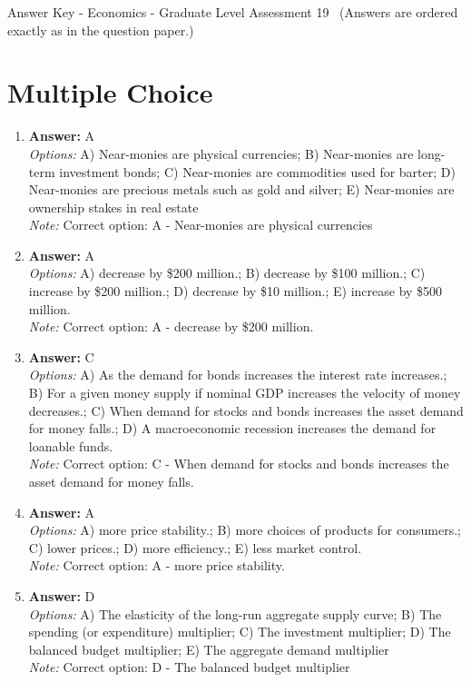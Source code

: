 \documentclass[12pt]{article}
\begin{document}
\begin{center}
Answer Key - Economics - Graduate Level Assessment 19 \
\small (Answers are ordered exactly as in the question paper.)
\end{center}

\section*{Multiple Choice}
\begin{enumerate}[label=\arabic*.]
\item \textbf{Answer:} A
\\ \textit{Options:} A) Near-monies are physical currencies; B) Near-monies are long-term investment bonds; C) Near-monies are commodities used for barter; D) Near-monies are precious metals such as gold and silver; E) Near-monies are ownership stakes in real estate
\\ \textit{Note:} Correct option: A - Near-monies are physical currencies
\item \textbf{Answer:} A
\\ \textit{Options:} A) decrease by \$200 million.; B) decrease by \$100 million.; C) increase by \$200 million.; D) decrease by \$10 million.; E) increase by \$500 million.
\\ \textit{Note:} Correct option: A - decrease by \$200 million.
\item \textbf{Answer:} C
\\ \textit{Options:} A) As the demand for bonds increases the interest rate increases.; B) For a given money supply if nominal GDP increases the velocity of money decreases.; C) When demand for stocks and bonds increases the asset demand for money falls.; D) A macroeconomic recession increases the demand for loanable funds.
\\ \textit{Note:} Correct option: C - When demand for stocks and bonds increases the asset demand for money falls.
\item \textbf{Answer:} A
\\ \textit{Options:} A) more price stability.; B) more choices of products for consumers.; C) lower prices.; D) more efficiency.; E) less market control.
\\ \textit{Note:} Correct option: A - more price stability.
\item \textbf{Answer:} D
\\ \textit{Options:} A) The elasticity of the long-run aggregate supply curve; B) The spending (or expenditure) multiplier; C) The investment multiplier; D) The balanced budget multiplier; E) The aggregate demand multiplier
\\ \textit{Note:} Correct option: D - The balanced budget multiplier
\end{enumerate}
\end{document}
